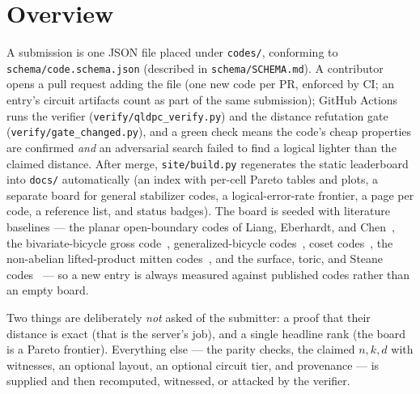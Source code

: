 \documentclass[11pt]{article}
\begin{document}
	\section{Overview}

	A submission is one JSON file placed under \texttt{codes/}, conforming to
	\texttt{schema/code.schema.json} (described in \texttt{schema/SCHEMA.md}). A
	contributor opens a pull request adding the file (one new code per PR,
	enforced by CI; an entry's circuit artifacts count as part of the same
	submission); GitHub Actions runs the verifier
	(\texttt{verify/qldpc\_verify.py}) and the distance refutation gate
	(\texttt{verify/gate\_changed.py}), and a green check means the code's
	cheap properties are confirmed \emph{and} an adversarial search failed to
	find a logical lighter than the claimed distance. After merge,
	\texttt{site/build.py} regenerates the static leaderboard into
	\texttt{docs/} automatically (an index with per-cell Pareto tables and
	plots, a separate board for general stabilizer codes, a logical-error-rate
	frontier, a page per code, a reference list, and status badges). The board
	is seeded with literature baselines --- the planar open-boundary codes of
	Liang, Eberhardt, and Chen~\cite{liang2025planar}, the bivariate-bicycle
	gross code~\cite{bravyi2024high}, generalized-bicycle
	codes~\cite{panteleev2021degenerate,wang2022distance}, coset
	codes~\cite{aydin2026breaking}, the non-abelian lifted-product mitten
	codes~\cite{bhardwaj2026mitten}, and the surface, toric, and Steane
	codes~\cite{kitaev2003fault,steane1996error} --- so a new entry is always
	measured against published codes rather than an empty board.

	Two things are deliberately \emph{not} asked of the submitter: a proof
	that their distance is exact (that is the server's job), and a single
	headline rank (the board is a Pareto frontier). Everything else --- the
	parity checks, the claimed $n,k,d$ with witnesses, an optional layout, an
	optional circuit tier, and provenance --- is supplied and then
	recomputed, witnessed, or attacked by the verifier.
\end{document}
